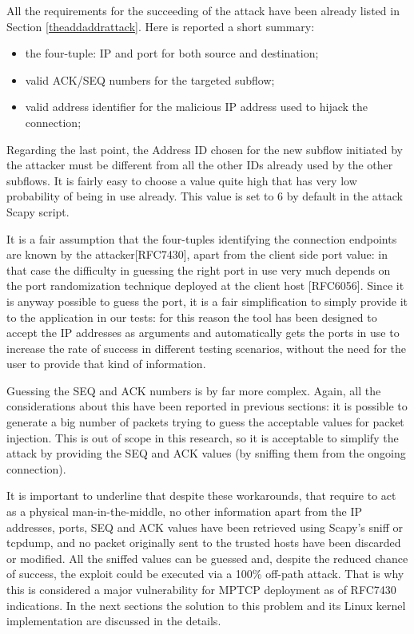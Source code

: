 \vspace{5mm} %
All the requirements for the succeeding of the attack have been already listed in Section \ref{theaddaddrattack}. Here is reported a short summary:

\begin{itemize}  
\item the four-tuple: IP and port for both source and destination;
\item valid ACK/SEQ numbers for the targeted subflow;
\item valid address identifier for the malicious IP address used to hijack the connection;
\end{itemize}

Regarding the last point, the Address ID chosen for the new subflow initiated by the attacker must be different from all the other IDs already used by the other subflows. It is fairly easy to choose a value quite high that has very low probability of being in use already. This value is set to 6 by default in the attack Scapy script.

It is a fair assumption that the four-tuples identifying the connection endpoints are known by the attacker[RFC7430], apart from the client side port value: in that case the difficulty in guessing the right port in use very much depends on the port randomization technique deployed at the client host [RFC6056]. Since it is anyway possible to guess the port, it is a fair simplification to simply provide it to the application in our tests: for this reason the tool has been designed to accept the IP addresses as arguments and automatically gets the ports in use to increase the rate of success in different testing scenarios, without the need for the user to provide that kind of information.

Guessing the SEQ and ACK numbers is by far more complex. Again, all the considerations about this have been reported in previous sections: it is possible to generate a big number of packets trying to guess the acceptable values for packet injection. This is out of scope in this research, so it is acceptable to simplify the attack by providing the SEQ and ACK values (by sniffing them from the ongoing connection).

It is important to underline that despite these workarounds, that require to act as a physical man-in-the-middle,  no other information apart from the IP addresses, ports, SEQ and ACK values have been retrieved using Scapy's sniff or tcpdump, and no packet originally sent to the trusted hosts have been discarded or modified. All the sniffed values can be guessed and, despite the reduced chance of success, the exploit could be executed via a 100\% off-path attack. That is why this is considered a major vulnerability for MPTCP deployment as of RFC7430 indications. In the next sections the solution to this problem and its Linux kernel implementation are discussed in the details.




